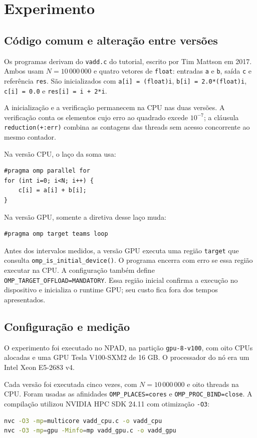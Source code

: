 \documentclass[11pt,letterpaper]{article}
\begin{document}
\section{Experimento}
\subsection{Código comum e alteração entre versões}
Os programas derivam do \texttt{vadd.c} do tutorial, escrito por Tim Mattson em 2017. Ambos usam $N=10\,000\,000$ e quatro vetores de \texttt{float}: entradas \texttt{a} e \texttt{b}, saída \texttt{c} e referência \texttt{res}. São inicializados com \texttt{a[i] = (float)i}, \texttt{b[i] = 2.0*(float)i}, \texttt{c[i] = 0.0} e \texttt{res[i] = i + 2*i}.

A inicialização e a verificação permanecem na CPU nas duas versões. A verificação conta os elementos cujo erro ao quadrado excede $10^{-7}$; a cláusula \texttt{reduction(+:err)} combina as contagens das threads sem acesso concorrente ao mesmo contador.

Na versão CPU, o laço da soma usa:

\begin{minipage}{\linewidth}
\begin{lstlisting}
#pragma omp parallel for
for (int i=0; i<N; i++) {
    c[i] = a[i] + b[i];
}
\end{lstlisting}
\end{minipage}

Na versão GPU, somente a diretiva desse laço muda:
\begin{lstlisting}
#pragma omp target teams loop
\end{lstlisting}

Antes dos intervalos medidos, a versão GPU executa uma região \texttt{target} que consulta \texttt{omp\_is\_initial\_device()}. O programa encerra com erro se essa região executar na CPU. A configuração também define \texttt{OMP\_TARGET\_OFFLOAD=MANDATORY}. Essa região inicial confirma a execução no dispositivo e inicializa o runtime GPU; seu custo fica fora dos tempos apresentados.

\subsection{Configuração e medição}
O experimento foi executado no NPAD, na partição \texttt{gpu-8-v100}, com oito CPUs alocadas e uma GPU Tesla V100-SXM2 de 16 GB. O processador do nó era um Intel Xeon E5-2683 v4.

Cada versão foi executada cinco vezes, com $N=10\,000\,000$ e oito threads na CPU. Foram usadas as afinidades \texttt{OMP\_PLACES=cores} e \texttt{OMP\_PROC\_BIND=close}. A compilação utilizou NVIDIA HPC SDK 24.11 com otimização \texttt{-O3}:
\begin{lstlisting}[language=bash]
nvc -O3 -mp=multicore vadd_cpu.c -o vadd_cpu
nvc -O3 -mp=gpu -Minfo=mp vadd_gpu.c -o vadd_gpu
\end{lstlisting}
\end{document}
